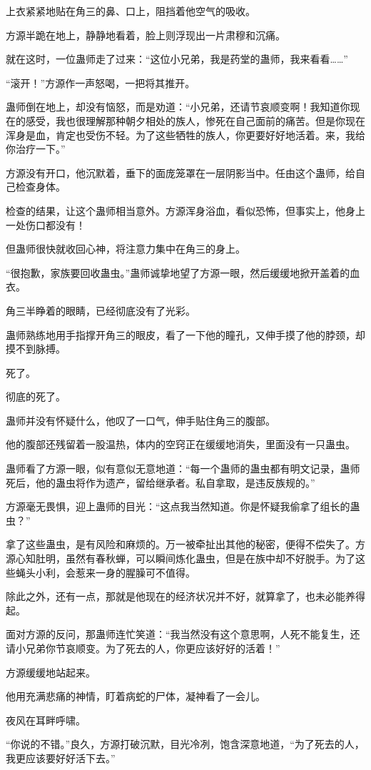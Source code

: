 \begin{this_body}
上衣紧紧地贴在角三的鼻、口上，阻挡着他空气的吸收。

方源半跪在地上，静静地看着，脸上则浮现出一片肃穆和沉痛。

就在这时，一位蛊师走了过来：“这位小兄弟，我是药堂的蛊师，我来看看……”

“滚开！”方源作一声怒喝，一把将其推开。

蛊师倒在地上，却没有恼怒，而是劝道：“小兄弟，还请节哀顺变啊！我知道你现在的感受，我也很理解那种朝夕相处的族人，惨死在自己面前的痛苦。但是你现在浑身是血，肯定也受伤不轻。为了这些牺牲的族人，你更要好好地活着。来，我给你治疗一下。”

方源没有开口，他沉默着，垂下的面庞笼罩在一层阴影当中。任由这个蛊师，给自己检查身体。

检查的结果，让这个蛊师相当意外。方源浑身浴血，看似恐怖，但事实上，他身上一处伤口都没有！

但蛊师很快就收回心神，将注意力集中在角三的身上。

“很抱歉，家族要回收蛊虫。”蛊师诚挚地望了方源一眼，然后缓缓地掀开盖着的血衣。

角三半睁着的眼睛，已经彻底没有了光彩。

蛊师熟练地用手指撑开角三的眼皮，看了一下他的瞳孔，又伸手摸了他的脖颈，却摸不到脉搏。

死了。

彻底的死了。

蛊师并没有怀疑什么，他叹了一口气，伸手贴住角三的腹部。

他的腹部还残留着一股温热，体内的空窍正在缓缓地消失，里面没有一只蛊虫。

蛊师看了方源一眼，似有意似无意地道：“每一个蛊师的蛊虫都有明文记录，蛊师死后，他的蛊虫将作为遗产，留给继承者。私自拿取，是违反族规的。”

方源毫无畏惧，迎上蛊师的目光：“这点我当然知道。你是怀疑我偷拿了组长的蛊虫？”

拿了这些蛊虫，是有风险和麻烦的。万一被牵扯出其他的秘密，便得不偿失了。方源心知肚明，虽然有春秋蝉，可以瞬间炼化蛊虫，但是在族中却不好脱手。为了这些蝇头小利，会惹来一身的腥臊可不值得。

除此之外，还有一点，那就是他现在的经济状况并不好，就算拿了，也未必能养得起。

面对方源的反问，那蛊师连忙笑道：“我当然没有这个意思啊，人死不能复生，还请小兄弟你节哀顺变。为了死去的人，你更应该好好的活着！”

方源缓缓地站起来。

他用充满悲痛的神情，盯着病蛇的尸体，凝神看了一会儿。

夜风在耳畔呼啸。

“你说的不错。”良久，方源打破沉默，目光冷冽，饱含深意地道，“为了死去的人，我更应该要好好活下去。”

\end{this_body}

